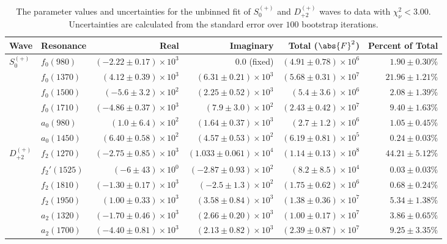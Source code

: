 \begin{table}[ht]
    \begin{center}
        \begin{tabular}{llrrrr}\toprule
        Wave & Resonance & Real & Imaginary & Total ($\abs{F}^2$) & Percent of Total \\\midrule
$S_{0}^{(+)}$ & $f_{0}(980)$ & $(-2.22 \pm 0.17) \times 10^{3}$ & $0.0$ (fixed) & $(4.91 \pm 0.78) \times 10^{6}$ & $1.90 \pm 0.30 \%$ \\
 & $f_{0}(1370)$ & $(4.12 \pm 0.39) \times 10^{3}$ & $(6.31 \pm 0.21) \times 10^{3}$ & $(5.68 \pm 0.31) \times 10^{7}$ & $21.96 \pm 1.21 \%$ \\
 & $f_{0}(1500)$ & $(-5.6 \pm 3.2) \times 10^{2}$ & $(2.25 \pm 0.52) \times 10^{3}$ & $(5.4 \pm 3.6) \times 10^{6}$ & $2.08 \pm 1.39 \%$ \\
 & $f_{0}(1710)$ & $(-4.86 \pm 0.37) \times 10^{3}$ & $(7.9 \pm 3.0) \times 10^{2}$ & $(2.43 \pm 0.42) \times 10^{7}$ & $9.40 \pm 1.63 \%$ \\
 & $a_{0}(980)$ & $(1.0 \pm 6.4) \times 10^{2}$ & $(1.64 \pm 0.37) \times 10^{3}$ & $(2.7 \pm 1.2) \times 10^{6}$ & $1.05 \pm 0.45 \%$ \\
 & $a_{0}(1450)$ & $(6.40 \pm 0.58) \times 10^{2}$ & $(4.57 \pm 0.53) \times 10^{2}$ & $(6.19 \pm 0.81) \times 10^{5}$ & $0.24 \pm 0.03 \%$ \\
$D_{+2}^{(+)}$ & $f_{2}(1270)$ & $(-2.75 \pm 0.85) \times 10^{3}$ & $(1.033 \pm 0.061) \times 10^{4}$ & $(1.14 \pm 0.13) \times 10^{8}$ & $44.21 \pm 5.12 \%$ \\
 & $f_{2}'(1525)$ & $(-6 \pm 43) \times 10^{0}$ & $(-2.87 \pm 0.93) \times 10^{2}$ & $(8.2 \pm 8.5) \times 10^{4}$ & $0.03 \pm 0.03 \%$ \\
 & $f_{2}(1810)$ & $(-1.30 \pm 0.17) \times 10^{3}$ & $(-2.5 \pm 1.3) \times 10^{2}$ & $(1.75 \pm 0.62) \times 10^{6}$ & $0.68 \pm 0.24 \%$ \\
 & $f_{2}(1950)$ & $(1.00 \pm 0.33) \times 10^{3}$ & $(3.58 \pm 0.84) \times 10^{3}$ & $(1.38 \pm 0.36) \times 10^{7}$ & $5.34 \pm 1.38 \%$ \\
 & $a_{2}(1320)$ & $(-1.70 \pm 0.46) \times 10^{3}$ & $(2.66 \pm 0.20) \times 10^{3}$ & $(1.00 \pm 0.17) \times 10^{7}$ & $3.86 \pm 0.65 \%$ \\
 & $a_{2}(1700)$ & $(-4.40 \pm 0.81) \times 10^{3}$ & $(2.13 \pm 0.82) \times 10^{3}$ & $(2.39 \pm 0.87) \times 10^{7}$ & $9.25 \pm 3.35 \%$ \\\bottomrule
        \end{tabular}
    \caption{The parameter values and uncertainties for the unbinned fit of $S_{0}^{(+)}$ and $D_{+2}^{(+)}$ waves to data with $\chi^2_\nu < 3.00$. Uncertainties are calculated from the standard error over $100$ bootstrap iterations.}\label{tab:unbinned-fit-chisqdof-3.0-Sp0p-Dp2p}
    \end{center}
\end{table}
